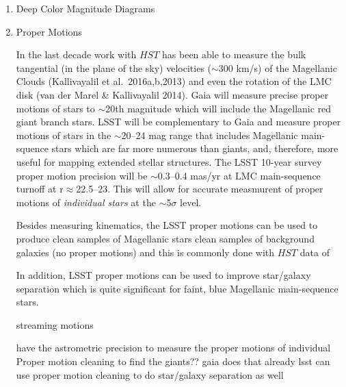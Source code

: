 \begin{enumerate}

\item Deep Color Magnitude Diagrams


\item Proper Motions

In the last decade work with $HST$ has been able to measure the bulk tangential (in the plane of the sky) velocities ($\sim$300 km/s) of the
Magellanic Clouds (Kallivayalil et al.\ 2016a,b,2013) and even the rotation of the LMC disk (van der Marel \& Kallivayalil 2014).
Gaia will measure precise proper motions of stars to $\sim$20th magnitude which will include the Magellanic red giant branch stars.
LSST will be complementary to Gaia and measure proper motions of stars in the $\sim$20--24 mag range that includes Magellanic main-squence stars
which are far more numerous than giants, and, therefore, more useful for mapping extended stellar structures.
The LSST 10-year survey proper motion precision will be $\sim$0.3--0.4 mas/yr at LMC main-sequence turnoff at r$\approx$22.5--23.  This
will allow for accurate measmurent of proper motions of {\em individual stars} at the $\sim$5$\sigma$ level.

Besides measuring kinematics, the LSST proper motions can be used to produce clean samples of Magellanic stars 
clean samples of background galaxies (no proper motions) and 
this is commonly done with $HST$ data of 

In addition, LSST proper motions can be used to improve star/galaxy separation which is quite significant for faint, blue Magellanic
main-sequence stars.

streaming motions

have the astrometric precision to measure the proper motions of individual
Proper motion cleaning to find the giants?? gaia does that already
lsst can use proper motion cleaning to do star/galaxy separation as well


\end{enumerate}
